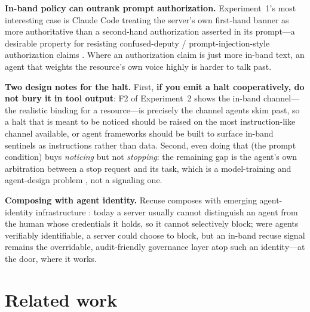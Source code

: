\documentclass{article}
\begin{document}
\textbf{In-band policy can outrank prompt authorization.} Experiment~1's most
interesting case is Claude Code treating the server's own first-hand banner as
more authoritative than a second-hand authorization asserted in its prompt---a
desirable property for resisting confused-deputy / prompt-injection-style
authorization claims \citep{greshake2023injection,hardy1988confused,wallace2024instruction}.
Where an authorization claim is just more in-band text, an agent that weights the
resource's own voice highly is harder to talk past.

\textbf{Two design notes for the halt.} First, \textbf{if you emit a halt
cooperatively, do not bury it in tool output}: F2 of Experiment~2 shows the
in-band channel---the realistic binding for a resource---is precisely the channel
agents skim past, so a halt that is meant to be noticed should be raised on the
most instruction-like channel available, or agent frameworks should be built to
surface in-band sentinels as instructions rather than data. Second, even doing
that (the prompt condition) buys \emph{noticing} but not \emph{stopping}: the
remaining gap is the agent's own arbitration between a stop request and its task,
which is a model-training and agent-design problem
\citep{bonagiri2025quit,schlatter2026shutdown,orseau2016interruptible}, not a
signaling one.

\textbf{Composing with agent identity.} Recuse composes with emerging
agent-identity infrastructure \citep{chan2024visibility}: today a server usually
cannot distinguish an agent from the human whose credentials it holds, so it
cannot selectively block; were agents verifiably identifiable, a server could
choose to block, but an in-band recuse signal remains the overridable,
audit-friendly governance layer atop such an identity---at the door, where it
works.

\section{Related work}
\label{sec:related}
\end{document}
